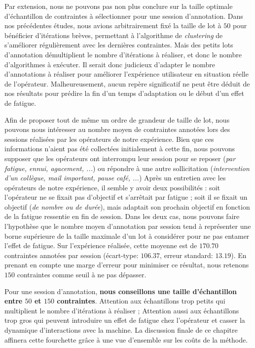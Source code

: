 			Par extension, nous ne pouvons pas non plus conclure sur la taille optimale d'échantillon de contraintes à sélectionner pour une session d'annotation.
			Dans nos précédentes études, nous avions arbitrairement fixé la taille de lot à $50$ pour bénéficier d'itérations brèves, permettant à l'algorithme de \textit{clustering} de s'améliorer régulièrement avec les dernières contraintes.
			Mais des petits lots d'annotation démultiplient le nombre d'itérations à réaliser, et donc le nombre d'algorithmes à exécuter.
			Il serait donc judicieux d'adapter le nombre d'annotations à réaliser pour améliorer l'expérience utilisateur en situation réelle de l'opérateur.
			Malheureusement, aucun repère significatif ne peut être déduit de nos résultats pour prédire la fin d'un temps d'adaptation ou le début d'un effet de fatigue.
			
			Afin de proposer tout de même un ordre de grandeur de taille de lot, nous pouvons nous intéresser au nombre moyen de contraintes annotées lors des sessions réalisées par les opérateurs de notre expérience.
			Bien que ces informations n'aient pas été collectées initialement à cette fin, nous pouvons supposer que les opérateurs ont interrompu leur session pour se reposer (\textit{par fatigue, ennui, agacement, ...}) ou répondre à une autre sollicitation (\textit{intervention d'un collègue, mail important, pause café, ...})
			Après un entretien avec les opérateurs de notre expérience, il semble y avoir deux possibilités : soit l'opérateur ne se fixait pas d'objectif et s'arrêtait par fatigue ; soit il se fixait un objectif (\textit{de nombre ou de durée}), mais adaptait son prochain objectif en fonction de la fatigue ressentie en fin de session.
			Dans les deux cas, nous pouvons faire l'hypothèse que le nombre moyen d'annotation par session tend à représenter une borne supérieure de la taille maximale d'un lot à considérer pour ne pas entamer l'effet de fatigue.
			Sur l'expérience réalisée, cette moyenne est de $170.70$ contraintes annotées par session (écart-type: $106.37$, erreur standard: $13.19$).
			En prenant en compte une marge d'erreur pour minimiser ce résultat, nous retenons $150$ contraintes comme seuil à ne pas dépasser.
			
			\begin{leftBarSummary}
				Pour une session d'annotation, \textbf{nous conseillons une taille d'échantillon entre $50$ et $150$ contraintes}.
				Attention aux échantillons trop petits qui multiplient le nombre d'itérations à réaliser ;
				Attention aussi aux échantillons trop gros qui peuvent introduire un effet de fatigue chez l'opérateur et casser la dynamique d'interactions avec la machine.
				La discussion finale de ce chapitre affinera cette fourchette grâce à une vue d'ensemble sur les coûts de la méthode.
			\end{leftBarSummary}
			

